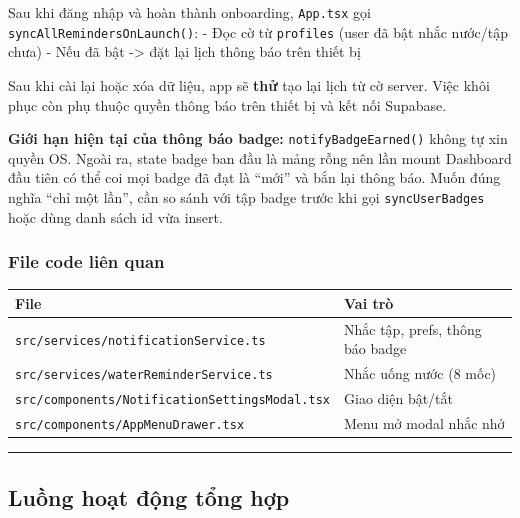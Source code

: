 \documentclass[12pt,a4paper]{article}
\newcounter{none}
\begin{document}
Sau khi đăng nhập và hoàn thành onboarding, \texttt{App.tsx} gọi
\texttt{syncAllRemindersOnLaunch()}: - Đọc cờ từ \texttt{profiles} (user
đã bật nhắc nước/tập chưa) - Nếu đã bật -\textgreater{} đặt lại lịch
thông báo trên thiết bị

Sau khi cài lại hoặc xóa dữ liệu, app sẽ \textbf{thử} tạo lại lịch từ cờ
server. Việc khôi phục còn phụ thuộc quyền thông báo trên thiết bị và
kết nối Supabase.

\textbf{Giới hạn hiện tại của thông báo badge:}
\texttt{notifyBadgeEarned()} không tự xin quyền OS. Ngoài ra, state
badge ban đầu là mảng rỗng nên lần mount Dashboard đầu tiên có thể coi
mọi badge đã đạt là ``mới'' và bắn lại thông báo. Muốn đúng nghĩa ``chỉ
một lần'', cần so sánh với tập badge trước khi gọi
\texttt{syncUserBadges} hoặc dùng danh sách id vừa insert.

\subsubsection{File code liên quan}\label{file-code-liuxean-quan-2}

{\def\LTcaptype{none} %
\begin{longtable}[]{@{}
  >{\raggedright\arraybackslash}p{}
  >{\raggedright\arraybackslash}p{}@{}}
\toprule\noalign{}
\begin{minipage}[b]{\linewidth}\raggedright
File
\end{minipage} & \begin{minipage}[b]{\linewidth}\raggedright
Vai trò
\end{minipage} \\
\midrule\noalign{}
\endhead
\bottomrule\noalign{}
\endlastfoot
\texttt{src/services/notificationService.ts} & Nhắc tập, prefs, thông
báo badge \\
\texttt{src/services/waterReminderService.ts} & Nhắc uống nước (8
mốc) \\
\texttt{src/components/NotificationSettingsModal.tsx} & Giao diện
bật/tắt \\
\texttt{src/components/AppMenuDrawer.tsx} & Menu mở modal nhắc nhở \\
\end{longtable}
}

\begin{center}\rule{0.5\linewidth}{0.5pt}\end{center}

\subsection{Luồng hoạt động tổng
hợp}\label{luux1ed3ng-houx1ea1t-ux111ux1ed9ng-tux1ed5ng-hux1ee3p}
\end{document}
